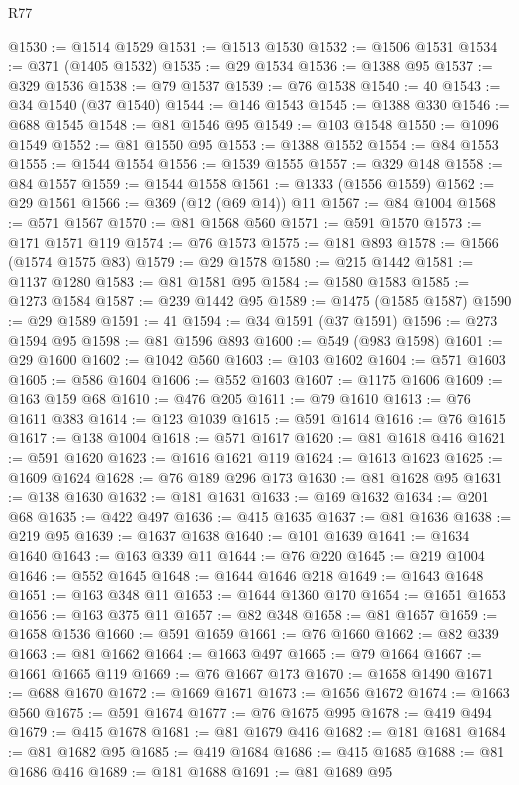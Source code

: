 \begin{lexlean}{R77}
\begin{coremodule}
@1530 := @1514 @1529
@1531 := @1513 @1530
@1532 := @1506 @1531
@1534 := @371 (@1405 @1532)
@1535 := @29 @1534
@1536 := @1388 @95
@1537 := @329 @1536
@1538 := @79 @1537
@1539 := @76 @1538
@1540 := 40
@1543 := @34 @1540 (@37 @1540)
@1544 := @146 @1543
@1545 := @1388 @330
@1546 := @688 @1545
@1548 := @81 @1546 @95
@1549 := @103 @1548
@1550 := @1096 @1549
@1552 := @81 @1550 @95
@1553 := @1388 @1552
@1554 := @84 @1553
@1555 := @1544 @1554
@1556 := @1539 @1555
@1557 := @329 @148
@1558 := @84 @1557
@1559 := @1544 @1558
@1561 := @1333 (@1556 @1559)
@1562 := @29 @1561
@1566 := @369 (@12 (@69 @14)) @11
@1567 := @84 @1004
@1568 := @571 @1567
@1570 := @81 @1568 @560
@1571 := @591 @1570
@1573 := @171 @1571 @119
@1574 := @76 @1573
@1575 := @181 @893
@1578 := @1566 (@1574 @1575 @83)
@1579 := @29 @1578
@1580 := @215 @1442
@1581 := @1137 @1280
@1583 := @81 @1581 @95
@1584 := @1580 @1583
@1585 := @1273 @1584
@1587 := @239 @1442 @95
@1589 := @1475 (@1585 @1587)
@1590 := @29 @1589
@1591 := 41
@1594 := @34 @1591 (@37 @1591)
@1596 := @273 @1594 @95
@1598 := @81 @1596 @893
@1600 := @549 (@983 @1598)
@1601 := @29 @1600
@1602 := @1042 @560
@1603 := @103 @1602
@1604 := @571 @1603
@1605 := @586 @1604
@1606 := @552 @1603
@1607 := @1175 @1606
@1609 := @163 @159 @68
@1610 := @476 @205
@1611 := @79 @1610
@1613 := @76 @1611 @383
@1614 := @123 @1039
@1615 := @591 @1614
@1616 := @76 @1615
@1617 := @138 @1004
@1618 := @571 @1617
@1620 := @81 @1618 @416
@1621 := @591 @1620
@1623 := @1616 @1621 @119
@1624 := @1613 @1623
@1625 := @1609 @1624
@1628 := @76 @189 @296 @173
@1630 := @81 @1628 @95
@1631 := @138 @1630
@1632 := @181 @1631
@1633 := @169 @1632
@1634 := @201 @68
@1635 := @422 @497
@1636 := @415 @1635
@1637 := @81 @1636
@1638 := @219 @95
@1639 := @1637 @1638
@1640 := @101 @1639
@1641 := @1634 @1640
@1643 := @163 @339 @11
@1644 := @76 @220
@1645 := @219 @1004
@1646 := @552 @1645
@1648 := @1644 @1646 @218
@1649 := @1643 @1648
@1651 := @163 @348 @11
@1653 := @1644 @1360 @170
@1654 := @1651 @1653
@1656 := @163 @375 @11
@1657 := @82 @348
@1658 := @81 @1657
@1659 := @1658 @1536
@1660 := @591 @1659
@1661 := @76 @1660
@1662 := @82 @339
@1663 := @81 @1662
@1664 := @1663 @497
@1665 := @79 @1664
@1667 := @1661 @1665 @119
@1669 := @76 @1667 @173
@1670 := @1658 @1490
@1671 := @688 @1670
@1672 := @1669 @1671
@1673 := @1656 @1672
@1674 := @1663 @560
@1675 := @591 @1674
@1677 := @76 @1675 @995
@1678 := @419 @494
@1679 := @415 @1678
@1681 := @81 @1679 @416
@1682 := @181 @1681
@1684 := @81 @1682 @95
@1685 := @419 @1684
@1686 := @415 @1685
@1688 := @81 @1686 @416
@1689 := @181 @1688
@1691 := @81 @1689 @95

\end{coremodule}
\end{lexlean}
